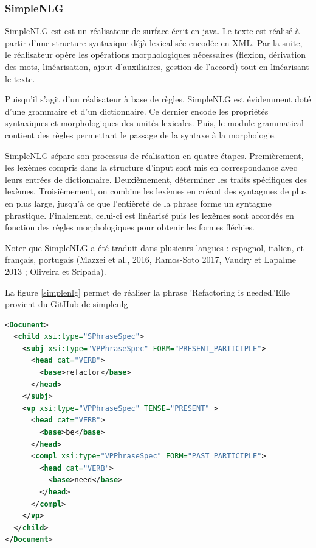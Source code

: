 \subsubsection{SimpleNLG}
SimpleNLG est \citep{GattSimpleNLGRealisationEngine2009} est un réalisateur de surface écrit en java. Le texte est réalisé à partir d'une structure syntaxique déjà lexicalisée encodée en XML. Par la suite, le réalisateur opère les opérations morphologiques nécessaires (flexion, dérivation des mots, linéarisation, ajout d'auxiliaires, gestion de l'accord) tout en linéarisant le texte.

Puisqu'il s'agit d'un réalisateur à base de règles, SimpleNLG est évidemment doté d'une grammaire et d'un dictionnaire. Ce dernier encode les propriétés syntaxiques et morphologiques des unités lexicales. Puis, le module grammatical contient des règles permettant le passage de la syntaxe à la morphologie.

SimpleNLG sépare son processus de réalisation en quatre étapes. Premièrement, les lexèmes compris dans la structure d'input sont mis en correspondance avec leurs entrées de dictionnaire. Deuxièmement, déterminer les traits spécifiques des lexèmes. Troisièmement, on combine les lexèmes en créant des syntagmes de plus en plus large, jusqu'à ce que l'entièreté de la phrase forme un syntagme phrastique. Finalement, celui-ci est linéarisé puis les lexèmes sont accordés en fonction des règles morphologiques pour obtenir les formes fléchies.

Noter que SimpleNLG a été traduit dans plusieurs langues : espagnol, italien, et français, portugais (Mazzei et al., 2016, Ramos-Soto 2017, Vaudry et Lapalme 2013 ; Oliveira et Sripada).

La figure \ref{simplenlg} permet de réaliser la phrase 'Refactoring is needed.'Elle provient du GitHub de simplenlg 

\begin{lstlisting}[language=Xml, caption=Structure d'input dans SimpleNLG, label=simplenlg]
<Document>
  <child xsi:type="SPhraseSpec">
    <subj xsi:type="VPPhraseSpec" FORM="PRESENT_PARTICIPLE">
      <head cat="VERB">
        <base>refactor</base>
      </head>
    </subj>
    <vp xsi:type="VPPhraseSpec" TENSE="PRESENT" >
      <head cat="VERB">
        <base>be</base>
      </head>
      <compl xsi:type="VPPhraseSpec" FORM="PAST_PARTICIPLE">
        <head cat="VERB">
          <base>need</base>
        </head>
      </compl>
    </vp>
  </child>
</Document>
\end{lstlisting}

